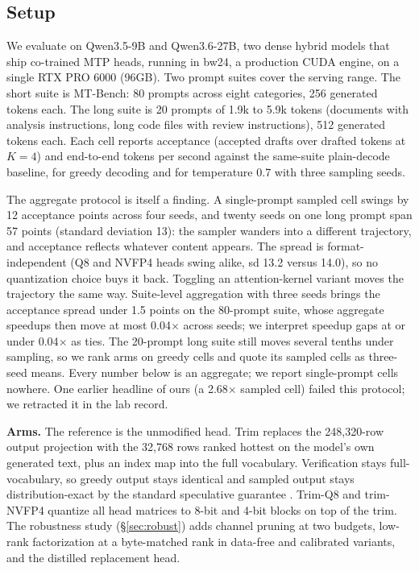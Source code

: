 \documentclass{article}
\newcommand{\x}{$\times$}
\begin{document}
\subsection{Setup}
\label{sec:setup}

We evaluate on Qwen3.5-9B and Qwen3.6-27B, two dense hybrid models that ship co-trained MTP heads, running in bw24, a production CUDA engine, on a single RTX PRO 6000 (96GB). Two prompt suites cover the serving range. The short suite is MT-Bench: 80 prompts across eight categories, 256 generated tokens each. The long suite is 20 prompts of 1.9k to 5.9k tokens (documents with analysis instructions, long code files with review instructions), 512 generated tokens each. Each cell reports acceptance (accepted drafts over drafted tokens at $K{=}4$) and end-to-end tokens per second against the same-suite plain-decode baseline, for greedy decoding and for temperature 0.7 with three sampling seeds.

The aggregate protocol is itself a finding. A single-prompt sampled cell swings by 12 acceptance points across four seeds, and twenty seeds on one long prompt span 57 points (standard deviation 13): the sampler wanders into a different trajectory, and acceptance reflects whatever content appears. The spread is format-independent (Q8 and NVFP4 heads swing alike, sd 13.2 versus 14.0), so no quantization choice buys it back. Toggling an attention-kernel variant moves the trajectory the same way. Suite-level aggregation with three seeds brings the acceptance spread under 1.5 points on the 80-prompt suite, whose aggregate speedups then move at most 0.04\x{} across seeds; we interpret speedup gaps at or under 0.04\x{} as ties. The 20-prompt long suite still moves several tenths under sampling, so we rank arms on greedy cells and quote its sampled cells as three-seed means. Every number below is an aggregate; we report single-prompt cells nowhere. One earlier headline of ours (a 2.68\x{} sampled cell) failed this protocol; we retracted it in the lab record.

\textbf{Arms.} The reference is the unmodified head. Trim replaces the 248,320-row output projection with the 32,768 rows ranked hottest on the model's own generated text, plus an index map into the full vocabulary. Verification stays full-vocabulary, so greedy output stays identical and sampled output stays distribution-exact by the standard speculative guarantee \cite{leviathan2023fast,chen2023accelerating}. Trim-Q8 and trim-NVFP4 quantize all head matrices to 8-bit and 4-bit blocks on top of the trim. The robustness study (\S\ref{sec:robust}) adds channel pruning at two budgets, low-rank factorization at a byte-matched rank in data-free and calibrated variants, and the distilled replacement head.
\end{document}
